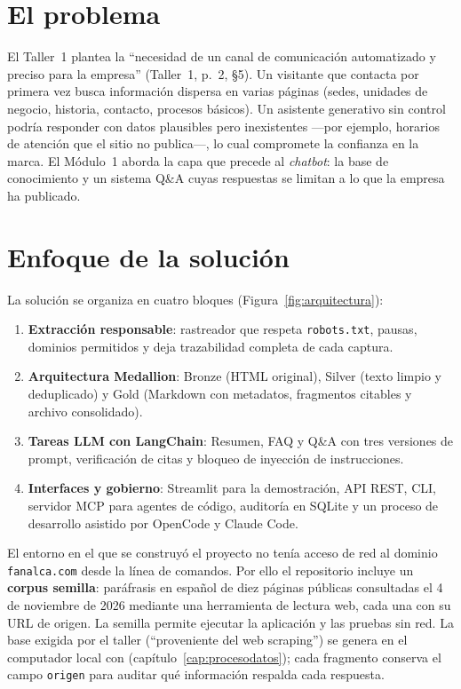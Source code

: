 \section{El problema}
El Taller~1 plantea la ``necesidad de un canal de comunicación automatizado y preciso para la empresa''
(Taller~1, p.~2, §5). Un visitante que contacta por primera vez busca información dispersa en varias páginas
(sedes, unidades de negocio, historia, contacto, procesos básicos). Un asistente generativo sin control podría
responder con datos plausibles pero inexistentes ---por ejemplo, horarios de atención que el sitio no
publica---, lo cual compromete la confianza en la marca. El Módulo~1 aborda la capa que precede al
\emph{chatbot}: la base de conocimiento y un sistema Q\&A cuyas respuestas se limitan a lo que la empresa ha
publicado.

\section{Enfoque de la solución}
La solución se organiza en cuatro bloques (Figura~\ref{fig:arquitectura}):
\begin{enumerate}
  \item \textbf{Extracción responsable}: rastreador que respeta \texttt{robots.txt}, pausas, dominios
        permitidos y deja trazabilidad completa de cada captura.
  \item \textbf{Arquitectura Medallion}: Bronze (HTML original), Silver (texto limpio y deduplicado) y Gold
        (Markdown con metadatos, fragmentos citables y archivo consolidado).
  \item \textbf{Tareas LLM con LangChain}: Resumen, FAQ y Q\&A con tres versiones de prompt, verificación de
        citas y bloqueo de inyección de instrucciones.
  \item \textbf{Interfaces y gobierno}: Streamlit para la demostración, API REST, CLI, servidor MCP para
        agentes de código, auditoría en SQLite y un proceso de desarrollo asistido por OpenCode y Claude Code.
\end{enumerate}

\begin{nota}
El entorno en el que se construyó el proyecto no tenía acceso de red al dominio \texttt{fanalca.com} desde la
línea de comandos. Por ello el repositorio incluye un \textbf{corpus semilla}: paráfrasis en español de diez
páginas públicas consultadas el 4 de noviembre de 2026 mediante una herramienta de lectura web, cada una con su
URL de origen. La semilla permite ejecutar la aplicación y las pruebas sin red. La base exigida por el taller
(``proveniente del web scraping'') se genera en el computador local con 
(capítulo~\ref{cap:procesodatos}); cada fragmento conserva el campo \texttt{origen} para auditar
qué información respalda cada respuesta.
\end{nota}

